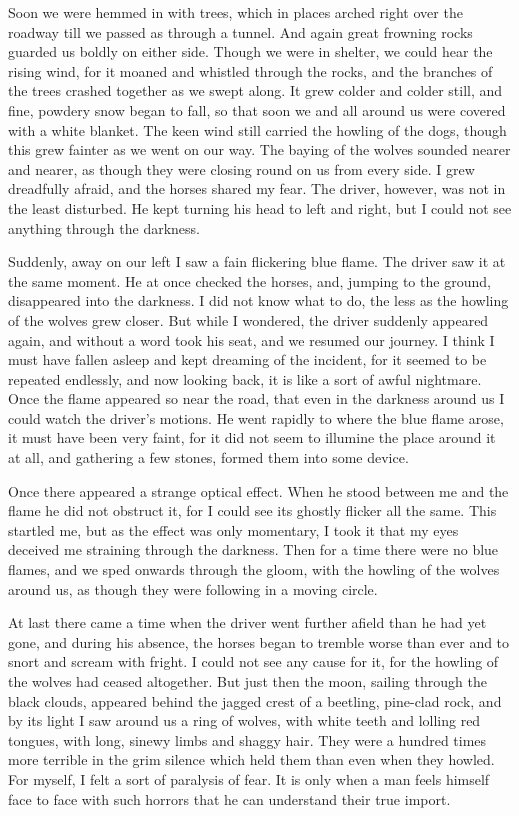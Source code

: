 Soon we were hemmed in with trees, which in places arched right over the roadway till we passed as through a tunnel. And again great frowning rocks guarded us boldly on either side. Though we were in shelter, we could hear the rising wind, for it moaned and whistled through the rocks, and the branches of the trees crashed together as we swept along. It grew colder and colder still, and fine, powdery snow began to fall, so that soon we and all around us were covered with a white blanket. The keen wind still carried the howling of the dogs, though this grew fainter as we went on our way. The baying of the wolves sounded nearer and nearer, as though they were closing round on us from every side. I grew dreadfully afraid, and the horses shared my fear. The driver, however, was not in the least disturbed. He kept turning his head to left and right, but I could not see anything through the darkness.

Suddenly, away on our left I saw a fain flickering blue flame. The driver saw it at the same moment. He at once checked the horses, and, jumping to the ground, disappeared into the darkness. I did not know what to do, the less as the howling of the wolves grew closer. But while I wondered, the driver suddenly appeared again, and without a word took his seat, and we resumed our journey. I think I must have fallen asleep and kept dreaming of the incident, for it seemed to be repeated endlessly, and now looking back, it is like a sort of awful nightmare. Once the flame appeared so near the road, that even in the darkness around us I could watch the driver's motions. He went rapidly to where the blue flame arose, it must have been very faint, for it did not seem to illumine the place around it at all, and gathering a few stones, formed them into some device.

Once there appeared a strange optical effect. When he stood between me and the flame he did not obstruct it, for I could see its ghostly flicker all the same. This startled me, but as the effect was only momentary, I took it that my eyes deceived me straining through the darkness. Then for a time there were no blue flames, and we sped onwards through the gloom, with the howling of the wolves around us, as though they were following in a moving circle.

At last there came a time when the driver went further afield than he had yet gone, and during his absence, the horses began to tremble worse than ever and to snort and scream with fright. I could not see any cause for it, for the howling of the wolves had ceased altogether. But just then the moon, sailing through the black clouds, appeared behind the jagged crest of a beetling, pine-clad rock, and by its light I saw around us a ring of wolves, with white teeth and lolling red tongues, with long, sinewy limbs and shaggy hair. They were a hundred times more terrible in the grim silence which held them than even when they howled. For myself, I felt a sort of paralysis of fear. It is only when a man feels himself face to face with such horrors that he can understand their true import.

